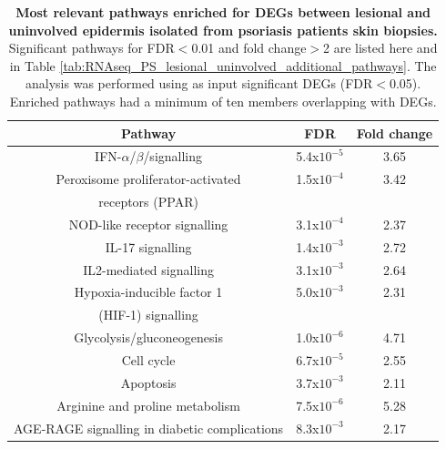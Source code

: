 \begin{table}[htbp]
\renewcommand{\arraystretch}{0.8}
\centering
\begin{tabular}{@{}c c c}
\toprule
\textbf{Pathway}                      & \textbf{FDR}           & \textbf{Fold change} \\
\midrule
\midrule
IFN-$\alpha$/$\beta$/signalling       &5.4x$10^{-5}$           &3.65                    \\
Peroxisome proliferator-activated     &1.5x$10^{-4}$           &3.42                    \\
receptors (PPAR) & &\\
NOD-like receptor signalling          &3.1x$10^{-4}$           &2.37                  \\
IL-17 signalling                      &1.4x$10^{-3}$           &2.72                    \\
IL2-mediated signalling               &3.1x$10^{-3}$           &2.64                    \\
Hypoxia-inducible factor 1            &5.0x$10^{-3}$           &2.31                     \\
(HIF-1) signalling & &\\
Glycolysis/gluconeogenesis            &1.0x$10^{-6}$           &4.71                     \\
Cell cycle                            &6.7x$10^{-5}$           &2.55                     \\
Apoptosis                             &3.7x$10^{-3}$           &2.11                      \\
Arginine and proline metabolism       &7.5x$10^{-6}$           &5.28                      \\
AGE-RAGE signalling in diabetic complications &8.3x$10^{-3}$  & 2.17 \\
\bottomrule
\end{tabular}
\medskip %
\caption[Most relevant pathways enriched for DEGs between lesional and uninvolved epidermis isolated from psoriasis patients skin biopsies.]{\textbf{Most relevant pathways enriched for DEGs between lesional and uninvolved epidermis isolated from psoriasis patients skin biopsies.} Significant pathways for FDR$<$0.01 and fold change$>$2 are listed here and in Table \ref{tab:RNAseq_PS_lesional_uninvolved_additional_pathways}. The analysis was performed using as input significant DEGs (FDR$<$0.05). Enriched pathways had a minimum of ten members overlapping with DEGs.}
\label{tab:RNAseq_PS_lesional_uninvolved_pathway_enrichment}
\end{table}


